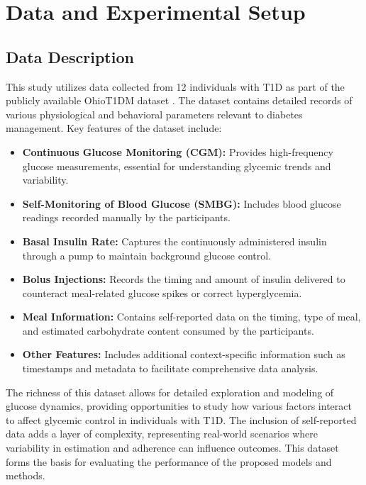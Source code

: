 
\section{Data and Experimental Setup}

\subsection{Data Description}
This study utilizes data collected from 12 individuals with T1D as part of the publicly available OhioT1DM dataset \cite{marling_ohiot1dm_2021}. The dataset contains detailed records of various physiological and behavioral parameters relevant to diabetes management. Key features of the dataset include:

\begin{itemize}
	\item \textbf{Continuous Glucose Monitoring (CGM):} Provides high-frequency glucose measurements, essential for understanding glycemic trends and variability.
	\item \textbf{Self-Monitoring of Blood Glucose (SMBG):} Includes blood glucose readings recorded manually by the participants.
	\item \textbf{Basal Insulin Rate:} Captures the continuously administered insulin through a pump to maintain background glucose control.
	\item \textbf{Bolus Injections:} Records the timing and amount of insulin delivered to counteract meal-related glucose spikes or correct hyperglycemia.
	\item \textbf{Meal Information:} Contains self-reported data on the timing, type of meal, and estimated carbohydrate content consumed by the participants.
	\item \textbf{Other Features:} Includes additional context-specific information such as timestamps and metadata to facilitate comprehensive data analysis.
\end{itemize}

The richness of this dataset allows for detailed exploration and modeling of glucose dynamics, providing opportunities to study how various factors interact to affect glycemic control in individuals with T1D. The inclusion of self-reported data adds a layer of complexity, representing real-world scenarios where variability in estimation and adherence can influence outcomes. This dataset forms the basis for evaluating the performance of the proposed models and methods.

